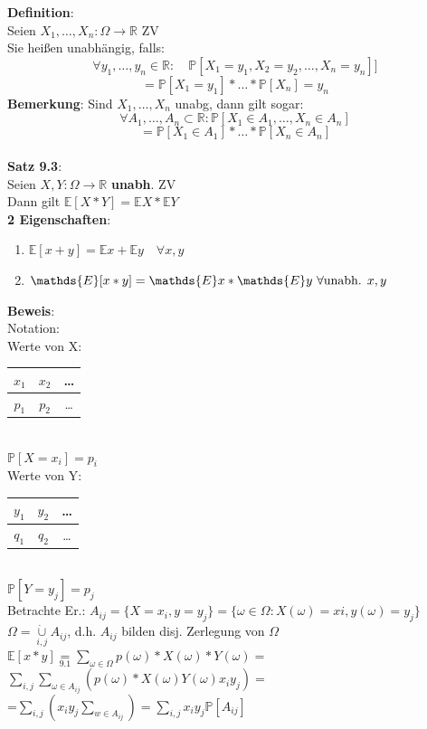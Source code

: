\textbf{Definition}:\\
Seien $X_1,\dots,X_n : \Omega \rightarrow\mathds{R}$ ZV\\
Sie heißen unabhängig, falls: 
$$\forall y_1,\dots,y_n \in \mathds{R}: \quad \mathds{P}[X_1 = y_1,X_2 =y_2,\dots,X_n=y_n]]$$
$$=\mathds{P}[X_1=y_1]*\dots*\mathds{P}[X_n]=y_n$$
\textbf{Bemerkung}: Sind $X_1,\dots,X_n$ unabg, dann gilt sogar:
$$\forall A_1,\dots,A_n \subset \mathds{R}: \mathds{P}[X_1 \in A_1,\dots,X_n \in A_n]$$
$$=\mathds{P}[X_1 \in A_1]*\dots*\mathds{P}[X_n \in A_n]$$\medskip\\
\textbf{Satz 9.3}:\\
Seien $X,Y :\Omega \rightarrow \mathds{R} $ \textbf{unabh}. ZV\\
Dann gilt $\mathds{E}[X*Y]= \mathds{E}X*\mathds{E}Y$\medskip\\
\textbf{2 Eigenschaften}:
\begin{enumerate}
	\item $\mathds{E}[x+y] = \mathds{E}x+\mathds{E}y \quad \forall x,y$
	\item $ \mathds{E}[x*y] = \mathds{E}x*\mathds{E}\text{$ y $ } \forall \text{unabh. } x,y$
\end{enumerate}
\textbf{Beweis}:\\
Notation:\\
Werte von X: 
\begin{tabular}{|c|c|c|}
	$x_1$&$x_2$&\dots\\\hline
	$p_1$&$p_2$&\dots
\end{tabular} \\
$\mathds{P}[X=x_i]=p_i$\smallskip\\
Werte von Y: 
\begin{tabular}{|c|c|c|}
	$y_1$&$y_2$&\dots\\\hline
	$q_1$&$q_2$&\dots
\end{tabular}\\
$\mathds{P}[Y=y_j]=p_j$\smallskip\\
Betrachte Er.: $A_{ij}=\{X=x_i, y=y_j\}=\{\omega \in \Omega : X(\omega)=xi,y(\omega)=y_j\}$\medskip\\
$\Omega = \underset{i,j}{\dot\cup}A_{ij}$, d.h. $A_{ij}$ bilden disj. Zerlegung von $\Omega$
\\
$\mathds{E}[x*y] \underset{9.1}{=} \sum_{\omega\in \Omega} p(\omega)*X(\omega)*Y(\omega)=$\medskip\\
$\sum_{i,j}\sum_{\omega\in A_{ij}} (p(\omega)*X(\omega)Y(\omega)x_iy_j)=$\smallskip\\
=$\sum_{i,j}(x_iy_j\sum_{w\in A_{ij}})=\sum_{i,j}x_iy_j\mathds{P}[A_{ij}]$\medskip\\
